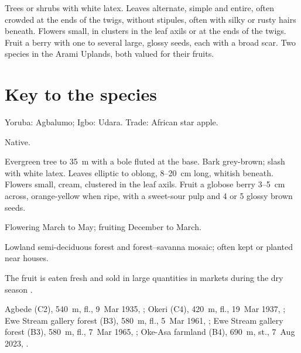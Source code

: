 \label{fam:sapotaceae}

Trees or shrubs with white latex. Leaves alternate, simple and entire,
often crowded at the ends of the twigs, without stipules, often with
silky or rusty hairs beneath. Flowers small, in clusters in the leaf
axils or at the ends of the twigs. Fruit a berry with one to several
large, glossy seeds, each with a broad scar. Two species in the Arami
Uplands, both valued for their fruits.

\section*{Key to the species}
\begin{florakey}
\end{florakey}

\label{sp:SAP01}

 Yoruba: Agbalumo; Igbo: Udara. Trade:
African star apple.

 Native.

 Evergreen tree to 35~m with a bole fluted at the
base. Bark grey-brown; slash with white latex. Leaves elliptic to
oblong, 8--20~cm long, whitish beneath. Flowers small, cream,
clustered in the leaf axils. Fruit a globose berry 3--5~cm across,
orange-yellow when ripe, with a sweet-sour pulp and 4 or 5 glossy
brown seeds.

 Flowering March to May; fruiting December to March.

 Lowland semi-deciduous forest and forest--savanna
mosaic; often kept or planted near houses.

 The fruit is eaten fresh and sold in large quantities in
markets during the dry season \citep{keay1989,orwa2009}.

 Agbede (C2), 540~m, fl., 9~Mar 1935, ;
Okeri (C4), 420~m, fl., 19~Mar 1937, ;
Ewe Stream gallery forest (B3), 580~m, fl., 5~Mar 1961, ;
Ewe Stream gallery forest (B3), 580~m, fl., 7~Mar 1965, ;
Oke-Asa farmland (B4), 690~m, st., 7~Aug 2023, .

